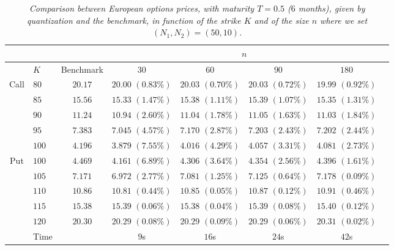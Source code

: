 \begin{table}[H]
	\centering
	\begin{tabular}{c|lcccccc}
		\toprule
		                        &       &           & \multicolumn{4}{c}{$n$}                                                                                 \\ \midrule
		                        & $K$   & Benchmark & $30$                    & $60$                    & $90$                    & $180$                   & \\ \midrule \midrule
		\multirow{5}{2em}{Call} & $80$  & $20.17$   & $20.00 \, \, (0.83\%)$  & $20.03 \, \, (0.70 \%)$ & $20.03 \, \, (0.72 \%)$ & $19.99 \, \, (0.92 \%)$ & \\
		                        & $85$  & $15.56$   & $15.33 \, \, (1.47\%)$  & $15.38 \, \, (1.11 \%)$ & $15.39 \, \, (1.07 \%)$ & $15.35 \, \, (1.31 \%)$ & \\
		                        & $90$  & $11.24$   & $10.94 \, \, (2.60\%)$  & $11.04 \, \, (1.78 \%)$ & $11.05 \, \, (1.63 \%)$ & $11.03 \, \, (1.84 \%)$ & \\
		                        & $95$  & $7.383$   & $7.045 \, \, (4.57\%)$  & $7.170 \, \, (2.87 \%)$ & $7.203 \, \, (2.43 \%)$ & $7.202 \, \, (2.44 \%)$ & \\
		                        & $100$ & $4.196$   & $3.879 \, \, (7.55\%)$  & $4.016 \, \, (4.29 \%)$ & $4.057 \, \, (3.31 \%)$ & $4.081 \, \, (2.73 \%)$ & \\ \midrule
		\multirow{6}{2em}{Put}  & $100$ & $4.469$   & $4.161 \, \, (6.89\%)$  & $4.306 \, \, (3.64 \%)$ & $4.354 \, \, (2.56 \%)$ & $4.396 \, \, (1.61 \%)$ & \\
		                        & $105$ & $7.171$   & $6.972 \, \, (2.77\%)$  & $7.081 \, \, (1.25 \%)$ & $7.125 \, \, (0.64 \%)$ & $7.178 \, \, (0.09 \%)$ & \\
		                        & $110$ & $10.86$   & $10.81 \, \, (0.44\%)$  & $10.85 \, \, (0.05 \%)$ & $10.87 \, \, (0.12 \%)$ & $10.91 \, \, (0.46 \%)$ & \\
		                        & $115$ & $15.38$   & $15.39 \, \, (0.06\%)$  & $15.38 \, \, (0.04 \%)$ & $15.39 \, \, (0.08 \%)$ & $15.40 \, \, (0.12 \%)$ & \\
		                        & $120$ & $20.30$   & $20.29 \, \, (0.08\%)$  & $20.29 \, \, (0.09 \%)$ & $20.29 \, \, (0.06 \%)$ & $20.31 \, \, (0.02 \%)$ & \\ \bottomrule
		                        & Time  &           & $9$s                    & $16$s                   & $24$s                   & $42$s                   & \\ \bottomrule
	\end{tabular}
	\caption[Pricing of European options in a Stationary Heston model with product hybrid recursive quantization with grids of size $(N_1,N_2)=(50,10)$.]{\textit{Comparison between European options prices, with maturity $T=0.5$ ($6$ months), given by quantization and the benchmark, in function of the strike $K$ and of the size $n$ where we set $(N_1,N_2)=(50,10)$.}}
	\label{RH:tab:price_european_fixedsize}
\end{table}


